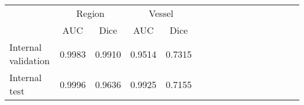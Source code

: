 \begin{tabular}{@{}llllllllllllllll@{}}
\toprule
   &
 \multicolumn{2}{c}{Region} &
  \multicolumn{2}{c}{Vessel}\\
  \cmidrule(l){2-3}\cmidrule(l){4-5}
  \multicolumn{1}{c}{} &
  \multicolumn{1}{c}{\acrshort{AUC}} &
  \multicolumn{1}{c}{Dice} &
  \multicolumn{1}{c}{\acrshort{AUC}} &
  \multicolumn{1}{c}{Dice}\\ \midrule
 Internal validation & 0.9983 & 0.9910 & 0.9514 & 0.7315 \\
 Internal test & 0.9996 & 0.9636 & 0.9925 & 0.7155 \\ \bottomrule
\end{tabular}
